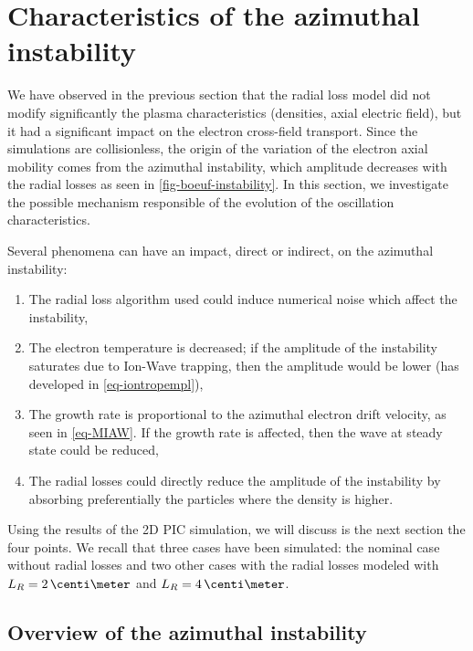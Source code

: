
\FloatBarrier
\section{Characteristics of the azimuthal instability}
\label{sec-Ztheta-instability}

We have observed in the previous section that the radial loss model did not modify significantly the plasma characteristics (densities, axial electric field), but it had a significant impact on the electron cross-field transport.
Since the simulations are collisionless, the origin of the variation of the electron axial mobility comes from the azimuthal instability, which amplitude decreases with the radial losses as seen in \cref{fig-boeuf-instability}.
In this section, we investigate the possible mechanism responsible of the evolution of the oscillation characteristics.

Several phenomena can have an impact, direct or indirect, on the azimuthal instability\string:
\begin{enumerate}
  \item The radial loss algorithm used could induce numerical noise which affect the instability,
  \item The electron temperature is decreased; if the amplitude of the instability saturates due to Ion-Wave trapping, then the amplitude would be lower (has developed in \cref{eq-iontropempl}),
  \item The growth rate is proportional to the azimuthal electron drift velocity, as seen in \cref{eq-MIAW}. If the growth rate is affected, then the wave at steady state could be reduced,
  \item The radial losses  could directly reduce the amplitude of the instability by absorbing preferentially the particles where the density is higher.
\end{enumerate}

Using the results of the \ac{2D} \ac{PIC} simulation, we will discuss is the next section the four points.
We recall that three cases have been simulated\string: the nominal case without radial losses and two other cases with the radial losses modeled with $L_R=2\,\centi\meter$ and $L_R=4\,\centi\meter$.



\subsection{Overview of the azimuthal instability} \label{subsec-azi_insta_Ztheta}

